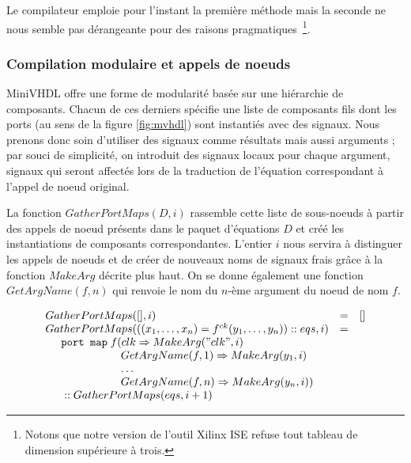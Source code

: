\documentclass[a4paper]{article}
\newcommand{\minivhdl}{{\sc MiniVHDL}}
\newcommand{\mybox}[1]{\mbox{\tt{#1}}}
\newcommand{\ind}[0]{\hspace{0.5cm}}
\newcommand{\Cons}[0]{\; \mathbf{::} \;}
\newcommand{\App}[2]{#1^{ck}(#2)}
\begin{document}
Le compilateur emploie pour l'instant la première méthode mais la seconde ne
nous semble pas dérangeante pour des raisons pragmatiques~\footnote{Notons que
  notre version de l'outil Xilinx ISE refuse tout tableau de
  dimension supérieure à trois.}.

\subsubsection{Compilation modulaire et appels de noeuds}

\minivhdl{} offre une forme de modularité basée sur une hiérarchie de
composants. Chacun de ces derniers spécifie une liste de composants fils dont
les ports (au sens de la figure \ref{fig:mvhdl}) sont instantiés avec des
signaux. Nous prenons donc soin d'utiliser des signaux comme résultats mais
aussi arguments ; par souci de simplicité, on introduit des signaux locaux
pour chaque argument, signaux qui seront affectés lors de la traduction de
l'équation correspondant à l'appel de noeud original.

La fonction $GatherPortMaps(D, i)$ rassemble cette liste de sous-noeuds à
partir des appels de noeud présents dans le paquet d'équations $D$ et
créé les instantiations de composants correspondantes. L'entier $i$ nous
servira à distinguer les appels de noeuds et de créer de nouveaux noms de
signaux frais grâce à la fonction $MakeArg$ décrite plus haut. On se donne
également une fonction $GetArgName(f,n)$ qui renvoie le nom du $n$-ème
argument du noeud de nom $f$.

\newcommand{\GPM}[2]{GatherPortMaps(#1,#2)}
\newcommand{\GAN}[2]{GetArgName(#1,#2)}

\[
\begin{array}{lcl}
  \GPM{[]}{i} & = & [] \\
  \GPM{((x_1,\dots,x_n) = \App{f}{y_1,\dots,y_n}) \Cons eqs}{i} & = &
  \\
  \ind \mybox{port map} \; f ( clk \Rightarrow \MA{"clk"}{i} \\
  \ind \ind \ind \ind \hspace{0.4cm} \GAN{f}{1} \Rightarrow \MA{y_1}{i} \\
  \ind \ind \ind \ind \hspace{0.4cm} \dots \\
  \ind \ind \ind \ind \hspace{0.4cm} \GAN{f}{n} \Rightarrow \MA{y_n}{i}) \\
  \ind \Cons \GPM{eqs}{i + 1}
\end{array}
\]
\end{document}
